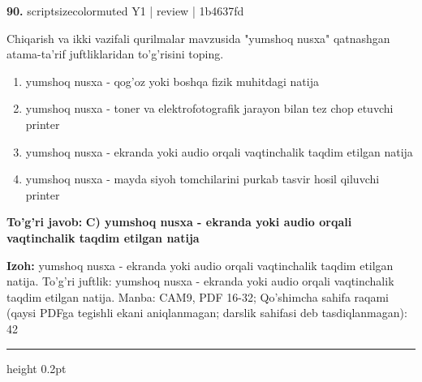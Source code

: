 \documentclass[10pt,a4paper]{article}
\begin{document}
{\bfseries\sffamily\color{ink} 90.} {scriptsizecolor{muted} Y1 | review | 1b4637fd}
\par
Chiqarish va ikki vazifali qurilmalar mavzusida "yumshoq nusxa" qatnashgan atama-ta'rif juftliklaridan to'g'risini toping.
\begin{enumerate}[label=\Alph*),leftmargin=9mm]
\item yumshoq nusxa - qog'oz yoki boshqa fizik muhitdagi natija
\item yumshoq nusxa - toner va elektrofotografik jarayon bilan tez chop etuvchi printer
\item yumshoq nusxa - ekranda yoki audio orqali vaqtinchalik taqdim etilgan natija
\item yumshoq nusxa - mayda siyoh tomchilarini purkab tasvir hosil qiluvchi printer
\end{enumerate}
\begin{tcolorbox}[enhanced,breakable,colback=teal!4,colframe=teal!60!black,boxrule=0.45pt,arc=1.2mm,left=2.7mm,right=2.7mm,top=1.8mm,bottom=1.8mm,before skip=2mm,after skip=2mm]
{\bfseries\sffamily\color{teal}To'g'ri javob:} \textbf{C) yumshoq nusxa - ekranda yoki audio orqali vaqtinchalik taqdim etilgan natija}
\par\smallskip
{\bfseries Izoh:} yumshoq nusxa - ekranda yoki audio orqali vaqtinchalik taqdim etilgan natija. To'g'ri juftlik: yumshoq nusxa - ekranda yoki audio orqali vaqtinchalik taqdim etilgan natija. Manba: CAM9, PDF 16-32; Qo'shimcha sahifa raqami (qaysi PDFga tegishli ekani aniqlanmagan; darslik sahifasi deb tasdiqlanmagan): 42
\end{tcolorbox}
\vspace{2mm}\hrule height 0.2pt\vspace{3mm}
\end{document}
